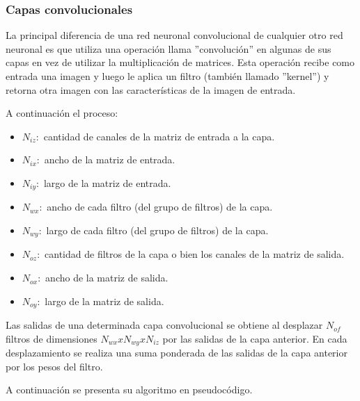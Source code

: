 \subsubsection{Capas convolucionales}

La principal diferencia de una red neuronal convolucional de cualquier otro red neuronal es que utiliza una operación llama ''convolución'' en algunas de sus capas en vez de utilizar la multiplicación de matrices. Esta operación recibe como entrada una imagen y luego le aplica un filtro (también llamado ''kernel'') y retorna otra imagen con las características de la imagen de entrada.\par
A continuación el proceso: \par

\begin{figure}[!h]
    \centering
     
    \label{fig:opconvolucion}
\end{figure}

\begin{itemize}
    \item $N_{iz}:$ cantidad de canales de la matriz de entrada a la capa. 
    \item $N_{ix}:$ ancho de la matriz de entrada. 
    \item $N_{iy}:$ largo de la matriz de entrada.
    \item $N_{wx}:$ ancho de cada filtro (del grupo de filtros) de la capa.
    \item $N_{wy}:$ largo de cada filtro (del grupo de filtros) de la capa.
    \item $N_{oz}:$ cantidad de filtros de la capa o bien los canales de la matriz de salida.
    \item $N_{ox}:$ ancho de la matriz de salida.
    \item $N_{oy}:$ largo de la matriz de salida.
\end{itemize}

Las salidas de una determinada capa convolucional se obtiene al desplazar $N_{of}$ filtros de dimensiones $ N_{wx} x N_{wy} x N_{iz}$ por las salidas de la capa anterior. En cada desplazamiento se realiza una suma ponderada de las salidas de la capa anterior por los pesos del filtro.\par

A continuación se presenta su algoritmo en pseudocódigo.\par

 


